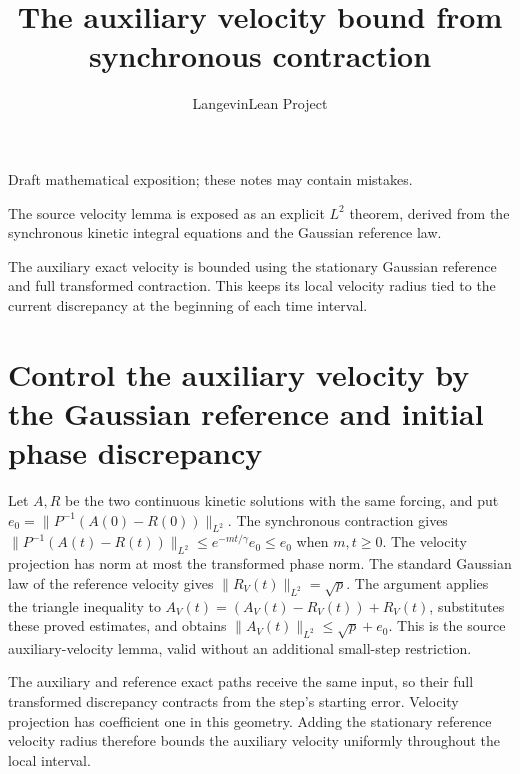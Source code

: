 \documentclass[11pt,a4paper]{article}
\title{\texorpdfstring{The auxiliary velocity bound from synchronous contraction}{The auxiliary velocity bound from synchronous contraction}}
\author{LangevinLean Project}
\date{}
\begin{document}
\maketitle
Draft mathematical exposition; these notes may contain mistakes.


The source velocity lemma is exposed as an explicit \(L^{2}\) theorem, derived from the synchronous kinetic integral equations and the Gaussian reference law.



The auxiliary exact velocity is bounded using the stationary Gaussian reference and full transformed contraction. This keeps its local velocity radius tied to the current discrepancy at the beginning of each time interval.


\section{\texorpdfstring{Control the auxiliary velocity by the Gaussian reference and initial phase discrepancy}{Control the auxiliary velocity by the Gaussian reference and initial phase discrepancy}}


Let \(A,R\) be the two continuous kinetic solutions with the same forcing, and put \(e_0=\|P^{-1}(A(0)-R(0))\|_{L^2}\). The synchronous contraction gives \(\|P^{-1}(A(t)-R(t))\|_{L^2}\le e^{-mt/\gamma}e_0\le e_0\) when \(m,t\ge0\). The velocity projection has norm at most the transformed phase norm. The standard Gaussian law of the reference velocity gives \(\|R_V(t)\|_{L^2}=\sqrt p\). The argument applies the triangle inequality to \(A_V(t)=(A_V(t)-R_V(t))+R_V(t)\), substitutes these proved estimates, and obtains \(\|A_V(t)\|_{L^2}\le\sqrt p+e_0\). This is the source auxiliary-velocity lemma, valid without an additional small-step restriction.



The auxiliary and reference exact paths receive the same input, so their full transformed discrepancy contracts from the step’s starting error. Velocity projection has coefficient one in this geometry. Adding the stationary reference velocity radius therefore bounds the auxiliary velocity uniformly throughout the local interval.
\end{document}
